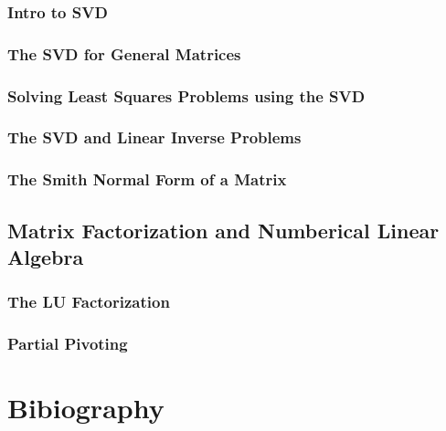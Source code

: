 \documentclass{book}
\theoremstyle{definition}
\theoremstyle{remark}
\begin{document}
\subsection{Intro to SVD}
\subsection{The SVD for General Matrices}
\subsection{Solving Least Squares Problems using the SVD}
\subsection{The SVD and Linear Inverse Problems}
\subsection{The Smith Normal Form of a Matrix}

\section{Matrix Factorization and Numberical Linear Algebra}
\subsection{The LU Factorization}
\subsection{Partial Pivoting}





\newpage
\chapter{Bibiography}
\printbibliography
\end{document}

